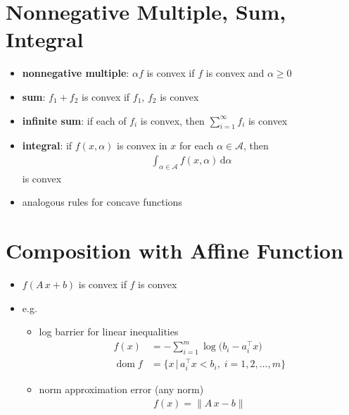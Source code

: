 \documentclass[11pt]{extarticle}
\newcommand{\ds}{\displaystyle}
\DeclareMathOperator*{\dom}{dom}
\theoremstyle{definition}
\begin{document}
\newpage

\section*{Nonnegative Multiple, Sum, Integral}
\begin{itemize}
  \item {\bf nonnegative multiple}: $\alpha f$ is convex if $f$ is convex and $\alpha\geqslant 0$
  \item {\bf sum}: $f_1 + f_2$ is convex if $f_1$, $f_2$ is convex
  \item {\bf infinite sum}: if each of $\ds f_i$ is convex, then $\ds\sum_{i = 1}^\infty f_i$ is convex
  \item {\bf integral}: if $\ds f(x, \alpha)$ is convex in $x$ for each $\alpha\in\mathcal{A}$, then 
    \begin{align*}
      \int_{\alpha\in\mathcal{A}}f(x,\alpha)\,\text{d}\alpha
    \end{align*} 
    is convex
  \item analogous rules for concave functions
\end{itemize}

\newpage

\section*{Composition with Affine Function}

\begin{itemize}
  \item $\ds f(A\,x + b)$ is convex if $f$ is convex
  \item e.g.
    \begin{itemize}
      \item log barrier for linear inequalities
        \begin{align*}
          f(x) &= - \sum_{i = 1}^m \log\big(b_i - a_i^\top x\big) \\
          \dom f &= \{x\,|\,a_i^\top x < b_i,\;i=1,2,\ldots,m\}
        \end{align*}
      \item norm approximation error (any norm)
        \begin{align*}
          f(x) = \|A\,x - b\|
        \end{align*}
    \end{itemize}
\end{itemize}

\newpage
\end{document}
